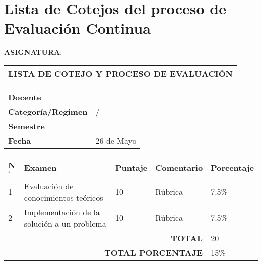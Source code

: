
\clearpage
{}
\vspace*{\fill}
{\centering
	\section{Lista de Cotejos del proceso de Evaluación Continua}}
\vspace*{\fill}

\clearpage


\vspace{1cm}
{\centering 
	\MakeUppercase{\textbf{Asignatura}}: \MakeUppercase{\cscourse}} \\
\vspace{0.5cm}

\begin{table}[H]
	\centering
	\begin{tabular}{|x{\textwidth}|}
		\hline 
		 \textbf{LISTA DE COTEJO Y PROCESO DE EVALUACIÓN} \\ \hline
	\end{tabular}
\end{table}

\begin{table}[H]
	\centering
	\begin{tabular}{|p{}|p{}|}
		\hline 
		\textbf{Docente} & \csauthor \\ \arrayrulecolor{black}\hline
		\textbf{Categoría/Regimen} & \cscategoria / \csregimen \\ \hline
		\textbf{Semestre} & \cssemestre \\ \hline
		\textbf{Fecha} & 26 de Mayo \\ \hline
	\end{tabular}
\end{table}

\begin{table}[H]
	\centering
	\begin{tabular}{|p{0.4cm}|p{4.8cm}|p{1.3cm}|p{5cm}|p{1.8cm}|}
		\hline 
		\textbf{N$^{\circ}$} & \textbf{Examen} & \textbf{Puntaje} & \textbf{Comentario} & \textbf{Porcentaje} \\ \hline
		1 & Evaluación de conocimientos teóricos & 10 & Rúbrica & 7.5\% \\ \hline
		2 & Implementación de la solución a un problema & 10 & Rúbrica & 7.5\% \\ \hline
		\multicolumn{4}{|r|}{\textbf{TOTAL}} & 20 \\ \hline
		\multicolumn{4}{|r|}{\textbf{TOTAL PORCENTAJE}} & 15\% \\ \hline
	\end{tabular}
\end{table}



